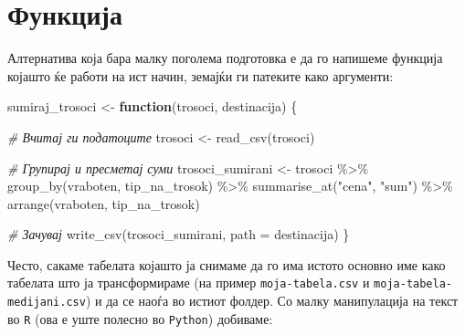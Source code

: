 \documentclass[
]{book}
\newenvironment{Shaded}{\begin{snugshade}}{\end{snugshade}}
\newcommand{\AttributeTok}[1]{\textcolor[rgb]{0.77,0.63,0.00}{#1}}
\newcommand{\CommentTok}[1]{\textcolor[rgb]{0.56,0.35,0.01}{\textit{#1}}}
\newcommand{\ControlFlowTok}[1]{\textcolor[rgb]{0.13,0.29,0.53}{\textbf{#1}}}
\newcommand{\FunctionTok}[1]{\textcolor[rgb]{0.00,0.00,0.00}{#1}}
\newcommand{\NormalTok}[1]{#1}
\newcommand{\OtherTok}[1]{\textcolor[rgb]{0.56,0.35,0.01}{#1}}
\newcommand{\SpecialCharTok}[1]{\textcolor[rgb]{0.00,0.00,0.00}{#1}}
\newcommand{\StringTok}[1]{\textcolor[rgb]{0.31,0.60,0.02}{#1}}
\begin{document}
\hypertarget{ux444ux443ux43dux43aux446ux438ux458ux430}{%
\section{Функција}\label{ux444ux443ux43dux43aux446ux438ux458ux430}}

Алтернатива која бара малку поголема подготовка е да го напишеме функција којашто ќе работи на ист начин, земајќи ги патеките како аргументи:

\begin{Shaded}
\begin{Highlighting}[]
\NormalTok{sumiraj\_trosoci }\OtherTok{\textless{}{-}} \ControlFlowTok{function}\NormalTok{(trosoci, destinacija) \{}
  
  \CommentTok{\# Вчитај ги податоците}
\NormalTok{  trosoci }\OtherTok{\textless{}{-}} \FunctionTok{read\_csv}\NormalTok{(trosoci)}
  
  \CommentTok{\# Групирај и пресметај суми}
\NormalTok{  trosoci\_sumirani }\OtherTok{\textless{}{-}}\NormalTok{ trosoci }\SpecialCharTok{\%\textgreater{}\%}
    \FunctionTok{group\_by}\NormalTok{(vraboten, tip\_na\_trosok) }\SpecialCharTok{\%\textgreater{}\%}
    \FunctionTok{summarise\_at}\NormalTok{(}\StringTok{"cena"}\NormalTok{, }\StringTok{"sum"}\NormalTok{) }\SpecialCharTok{\%\textgreater{}\%} 
    \FunctionTok{arrange}\NormalTok{(vraboten, tip\_na\_trosok)}
  
  \CommentTok{\# Зачувај}
  \FunctionTok{write\_csv}\NormalTok{(trosoci\_sumirani,}
            \AttributeTok{path =}\NormalTok{ destinacija)}
\NormalTok{\}}
\end{Highlighting}
\end{Shaded}

Често, сакаме табелата којашто ја снимаме да го има истото основно име како табелата што ја трансформираме (на пример \texttt{moja-tabela.csv} и \texttt{moja-tabela-medijani.csv}) и да се наоѓа во истиот фолдер. Со малку манипулација на текст во \texttt{R} (ова е уште полесно во \texttt{Python}) добиваме:
\end{document}
